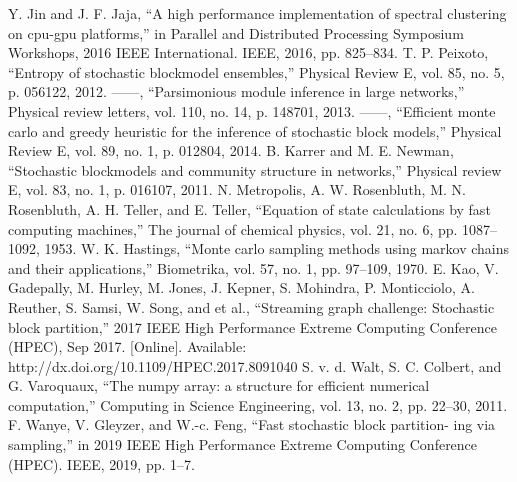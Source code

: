 \documentclass[conference]{IEEEtran}
\begin{document}
	\begin{thebibliography}{00}
		 Y. Jin and J. F. Jaja, “A high performance implementation of spectral
clustering on cpu-gpu platforms,” in Parallel and Distributed Processing
Symposium Workshops, 2016 IEEE International. IEEE, 2016, pp.
825–834.
 T. P. Peixoto, “Entropy of stochastic blockmodel ensembles,” Physical
Review E, vol. 85, no. 5, p. 056122, 2012.
 ——, “Parsimonious module inference in large networks,” Physical
review letters, vol. 110, no. 14, p. 148701, 2013.
 ——, “Efficient monte carlo and greedy heuristic for the inference of
stochastic block models,” Physical Review E, vol. 89, no. 1, p. 012804,
2014.
 B. Karrer and M. E. Newman, “Stochastic blockmodels and community
structure in networks,” Physical review E, vol. 83, no. 1, p. 016107,
2011.
 N. Metropolis, A. W. Rosenbluth, M. N. Rosenbluth, A. H. Teller, and
E. Teller, “Equation of state calculations by fast computing machines,”
The journal of chemical physics, vol. 21, no. 6, pp. 1087–1092, 1953.
 W. K. Hastings, “Monte carlo sampling methods using markov chains
and their applications,” Biometrika, vol. 57, no. 1, pp. 97–109, 1970.
 E. Kao, V. Gadepally, M. Hurley, M. Jones, J. Kepner, S. Mohindra, P. Monticciolo, A. Reuther, S. Samsi, W. Song, and et al.,
“Streaming graph challenge: Stochastic block partition,” 2017 IEEE
High Performance Extreme Computing Conference (HPEC), Sep 2017.
[Online]. Available: http://dx.doi.org/10.1109/HPEC.2017.8091040
 S. v. d. Walt, S. C. Colbert, and G. Varoquaux, “The numpy array: a
structure for efficient numerical computation,” Computing in Science
Engineering, vol. 13, no. 2, pp. 22–30, 2011.
 F. Wanye, V. Gleyzer, and W.-c. Feng, “Fast stochastic block partition-
ing via sampling,” in 2019 IEEE High Performance Extreme Computing
Conference (HPEC). IEEE, 2019, pp. 1–7.
	\end{thebibliography}
	\vspace{12pt}
\end{document}
